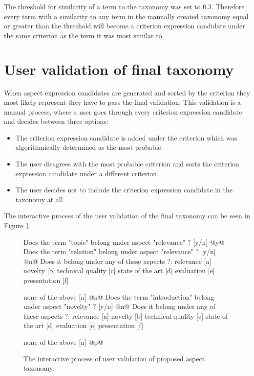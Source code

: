 The threshold for similarity of a term to the taxonomy was set to 0.3. Therefore every term with a similarity to any term in the manually created taxonomy equal or greater than the threshold will become a criterion expression candidate under the same criterion as the term it was most similar to.
\section{User validation of final taxonomy}
\label{sec:user_val}
When aspect expression candidates are generated and sorted by the criterion they most likely represent they have to pass the final validation. This validation is a manual process, where a user goes through every criterion expression candidate and decides between three options:
\begin{itemize}
\item The criterion expression candidate is added under the criterion which was algorithmically determined as the most probable.
\item The user disagrees with the most probable criterion  and sorts the criterion expression candidate under a different criterion.
\item The user decides not to include the criterion expression candidate in the taxonomy at all.
\end{itemize}

The interactive process of the user validation of the final taxonomy can be seen in Figure \ref{img:user_tax}.
\begin{figure}[!htb]

\begin{commandshell}
Does the term "topic" belong under aspect "relevance" ? [y/n]
@y@
Does the term "relation" belong under aspect "relevance" ? [y/n]
@n@
Does it belong under any of these aspects ?:
relevance                [a]
novelty                  [b]
technical quality        [c]
state of the art         [d]
evaluation               [e]
presentation             [f]

none of the above        [n]
@n@
Does the term "introduction" belong under aspect "novelty" ? [y/n]
@n@
Does it belong under any of these aspects ?:
relevance                [a]
novelty                  [b]
technical quality        [c]
state of the art         [d]
evaluation               [e]
presentation             [f]

none of the above        [n]
@p@
\end{commandshell}
\caption{The interactive process of user validation of proposed aspect taxonomy.}
\label{img:user_tax}
\end{figure}
